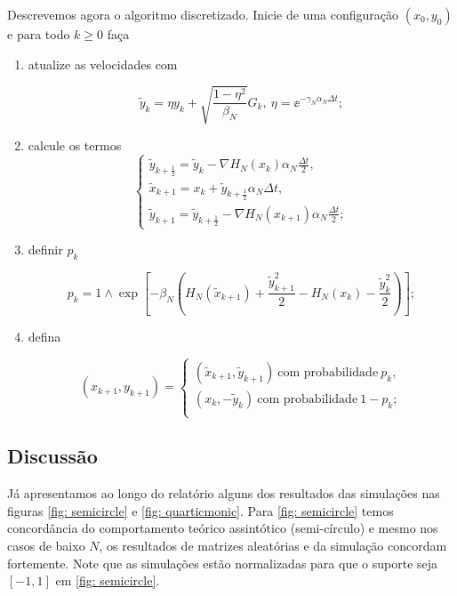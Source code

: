 Descrevemos agora o algoritmo discretizado. Inicie de uma configuração $(x_0, y_0)$ e para todo $k \geq 0$ faça

\begin{enumerate}
	\item atualize as velocidades com
	
	\[
	\tilde{y}_k = \eta y_k + \sqrt{\frac{1-\eta^2}{\beta_N}} G_k, \ \eta = \ee^{-\gamma_N \alpha_N \Delta t};
	\]
	
	\item calcule os termos
	\[
	\begin{cases}
		\tilde{y}_{k+\frac{1}{2}} = \tilde{y}_k - \nabla H_N(x_k) \alpha_N \frac{\Delta t}{2}, \\
		\tilde{x}_{k+1} = x_k + \tilde{y}_{k + \frac{1}{2}} \alpha_N \Delta t, \\
		\tilde{y}_{k+1} = \tilde{y}_{k+\frac{1}{2}} - \nabla H_N(x_{k+1}) \alpha_N \frac{\Delta t}{2};
	\end{cases}
	\]
	
	\item definir $p_k$
	
	\[
	p_k = 1 \wedge \exp{\left[ -\beta_N \left(  H_N(\tilde{x}_{k+1}) + \frac{\tilde{y}^2_{k+1}}{2} - H_N(x_k) - \frac{\tilde{y}^2_k}{2} \right)\right] };
	\]
	
	\item defina
	
	\[
	(x_{k+1}, y_{k+1}) = 
	\begin{cases}
		(\tilde{x}_{k+1}, \tilde{y}_{k+1}) \ \text{com probabilidade} \ p_k, \\
		(x_k, -\tilde{y}_{k}) \ \text{com probabilidade} \ 1-p_k; \\
	\end{cases}
	\]
	
\end{enumerate}

\subsection{Discussão}

Já apresentamos ao longo do relatório alguns dos resultados das simulações nas figuras \ref{fig: semicircle} e \ref{fig: quarticmonic}. Para \ref{fig: semicircle} temos concordância do comportamento teórico assintótico (semi-círculo) e mesmo nos casos de baixo $N$, os resultados de matrizes aleatórias e da simulação concordam fortemente. Note que as simulações estão normalizadas para que o suporte seja $[-1,1]$ em \ref{fig: semicircle}.


